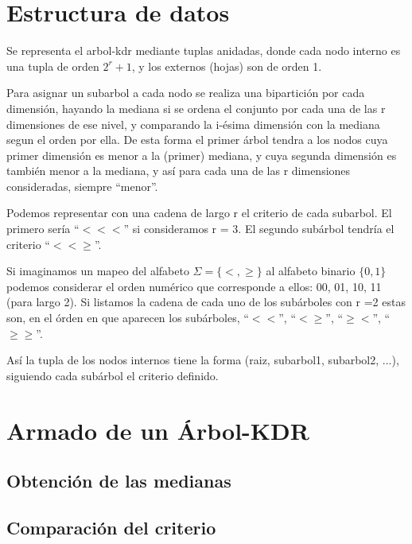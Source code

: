\section{Estructura de datos}
Se representa el arbol-kdr mediante tuplas anidadas, donde cada
nodo interno es una tupla de orden $2^r + 1$, y los externos (hojas)
son de orden 1.

Para asignar un subarbol a cada nodo se realiza una bipartición por
cada dimensión, hayando la mediana si se ordena el conjunto por cada
una de las r dimensiones de ese nivel, y comparando la i-ésima
dimensión con la mediana segun el orden por ella.
De esta forma el primer árbol tendra a los nodos cuya primer
dimensión es menor a la (primer) mediana, y cuya segunda dimensión
es también menor a la mediana, y así para cada una de las r
dimensiones consideradas, siempre ``menor''.

Podemos representar con una cadena de largo r el
criterio de cada subarbol. El primero sería ``$<<<$'' si consideramos
r = 3. El segundo subárbol tendría el criterio ``$<<\geq$''.

Si imaginamos un mapeo del alfabeto $\Sigma = \{ <, \geq \}$ al
alfabeto binario $\{ 0, 1 \}$ podemos considerar el orden numérico
que corresponde a ellos: 00, 01, 10, 11 (para largo 2).
Si
listamos la cadena de cada uno de los subárboles con r =2 estas son,
en el órden en que aparecen los subárboles, ``$<<$'', ``$<\geq$'',
``$\geq<$'', ``$\geq\geq$''.
  
Así la tupla de los nodos internos tiene la forma (raiz, subarbol1,
subarbol2, ...), siguiendo cada subárbol el criterio definido.



\section{Armado de un Árbol-KDR}
\subsection{Obtención de las medianas}


\subsection{Comparación del criterio}


